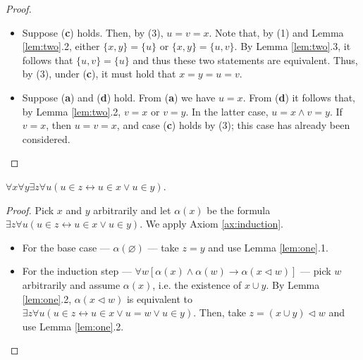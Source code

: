 \begin{proof}
\begin{enumerate}
\begin{itemize}
            (\textbf{d}) can be rewritten to $\{u,v\}=\{x\}$, implying (\textbf{c}) and (\textbf{d}) are equivalent.
            Thus, by (3), under (\textbf{b}), it must hold that $u=v=x=y$.
            \item Suppose (\textbf{c}) holds. Then, by (3), $u=v=x$. Note that, by (1) and Lemma \ref{lem:two}.2, 
            either $\{x,y\}=\{u\}$ or $\{x,y\}=\{u,v\}$.  By Lemma \ref{lem:two}.3, it follows that $\{u,v\}=\{u\}$ and 
            thus these two statements are equivalent. Thus, by (3), under (\textbf{c}), it must hold that $x=y=u=v$.
            \item Suppose (\textbf{a}) and (\textbf{d}) hold. From (\textbf{a}) we have $u=x$. 
            From (\textbf{d}) it follows that, by Lemma \ref{lem:two}.2, $v=x$ or $v=y$. In the latter case, 
            $u=x\land v=y$. If $v=x$, then $u=v=x$, and case (\textbf{c}) holds by (3); this case has already been considered.
        \end{itemize}
    \end{enumerate}
\end{proof}

\begin{theorem}
    \label{thm:exists_union}
    \leanok
    $\forall x \forall y \exists z \forall u (u \in z \leftrightarrow u \in x \lor u \in y)$.
\end{theorem}

\begin{proof}
    \leanok
    Pick $x$ and $y$ arbitrarily and let $\alpha (x)$ be the formula $\exists z \forall u (u \in z \leftrightarrow u \in x \lor u \in y)$.
    We apply Axiom \ref{ax:induction}.
    \begin{itemize}
        \item For the base case — $\alpha (\varnothing)$ — take $z=y$ and use Lemma \ref{lem:one}.1.
        \item For the induction step — $\forall w[\alpha(x) \land \alpha(w) \rightarrow \alpha(x \lhd w)]$ — 
        pick $w$ arbitrarily and assume $\alpha(x)$, i.e. the existence of $x \cup y$. By Lemma \ref{lem:one}.2, 
        $\alpha(x \lhd w)$ is equivalent to $\exists z \forall u (u \in z \leftrightarrow u \in x \lor u = w \lor u \in y)$.
        Then, take $z= (x \cup y) \lhd w$ and use Lemma \ref{lem:one}.2.
    \end{itemize}
\end{proof}

